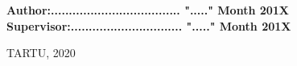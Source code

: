 \begin{titlepage}
\begin{center}
\textbf{Author:.................................... "....." Month   201X}\\[0.5cm]

\textbf{Supervisor:............................... "....." Month   201X}\\[0.5cm]


\vfill

{\large TARTU, 2020}

\end{center}

\end{titlepage}
